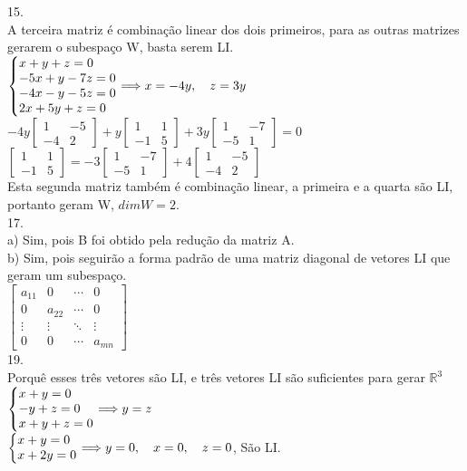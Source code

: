 \documentclass[12pt]{article}
\begin{document}
15.\\
A terceira matriz é combinação linear dos dois primeiros, para as outras matrizes gerarem o subespaço W, basta serem LI.\\
$\left\{\begin{array}{@{}l@{}}
	x+y+z=0\\
	-5x+y-7z=0\\
	-4x-y-5z=0\\
	2x+5y+z=0
\end{array}\right. \Longrightarrow x=-4y,\quad z=3y$\\
$-4y\begin{bmatrix}1&-5\\-4&2\end{bmatrix}+
   y\begin{bmatrix}1&1\\-1&5\end{bmatrix}+
  3y\begin{bmatrix}1&-7\\-5&1\end{bmatrix}=0$\\
$ \begin{bmatrix}1&1\\-1&5\end{bmatrix}=
-3\begin{bmatrix}1&-7\\-5&1\end{bmatrix}+
 4\begin{bmatrix}1&-5\\-4&2\end{bmatrix}$\\
Esta segunda matriz também é combinação linear, a primeira e a quarta são LI, portanto geram W, $dimW=2$.\\

17.\\
a) Sim, pois B foi obtido pela redução da matriz A.\\
b) Sim, pois seguirão a forma padrão de uma matriz diagonal de vetores LI que geram um subespaço.\\
$\begin{bmatrix}a_{11}&0&\cdots&0\\0&a_{22}&\cdots&0\\\vdots&\vdots&\ddots&\vdots\\0&0&\cdots&a_{mn}\end{bmatrix}$\\

19.\\
Porquê esses três vetores são LI, e três vetores LI são suficientes para gerar $\mathds{R}^{3}$\\
$\left\{\begin{array}{@{}l@{}}
	x+y=0\\
	-y+z=0\\
	x+y+z=0
\end{array}\right. \Longrightarrow y=z$\\
$\left\{\begin{array}{@{}l@{}}
	x+y=0\\
	x+2y=0
\end{array}\right. \Longrightarrow y=0,\quad x=0,\quad z=0$, São LI.\\
\end{document}
